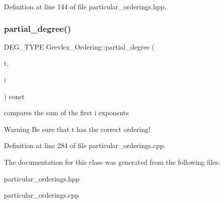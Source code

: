 Definition at line 144 of file particular\+\_\+orderings.\+hpp.

\mbox{\label{class_grevlex___ordering_a24d2e7bf28ecab1d8a6c703147f48341}} 
\subsubsection{\texorpdfstring{partial\+\_\+degree()}{partial\_degree()}}
{\footnotesize\ttfamily D\+E\+G\+\_\+\+T\+Y\+PE Grevlex\+\_\+\+Ordering\+::partial\+\_\+degree (\begin{DoxyParamCaption}\item[{const \hyperlink{class_monomial}{Monomial} \&}]{t,  }\item[{N\+V\+A\+R\+\_\+\+T\+Y\+PE}]{i }\end{DoxyParamCaption}) const}



compares the sum of the first i exponents 

\begin{DoxyWarning}{Warning}
Be sure that {\ttfamily t} has the correct ordering! 
\end{DoxyWarning}


Definition at line 284 of file particular\+\_\+orderings.\+cpp.



The documentation for this class was generated from the following files\+:\begin{DoxyCompactItemize}
\item 
particular\+\_\+orderings.\+hpp\item 
particular\+\_\+orderings.\+cpp\end{DoxyCompactItemize}
